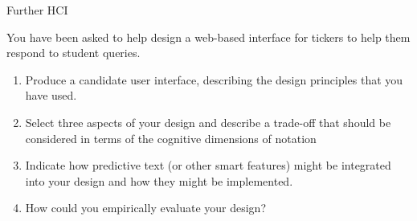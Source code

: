 \documentclass{tripos}  %
\begin{document}
\begin{question}[MockIB,year=2024,paper=1,question=11,author=rrw]{Further HCI}


You have been asked to help design a web-based interface for tickers to help them respond to student queries.

\begin{enumerate}
\item Produce a candidate user interface, describing the design principles that you have used. 
\item Select three aspects of your design and describe a trade-off that should be considered in terms of the cognitive dimensions of notation 
\item Indicate how predictive text (or other smart features) might be integrated into your design and how they might be implemented. 
\item How could you empirically evaluate your design? 
\end{enumerate}

\end{question}
\end{document}
